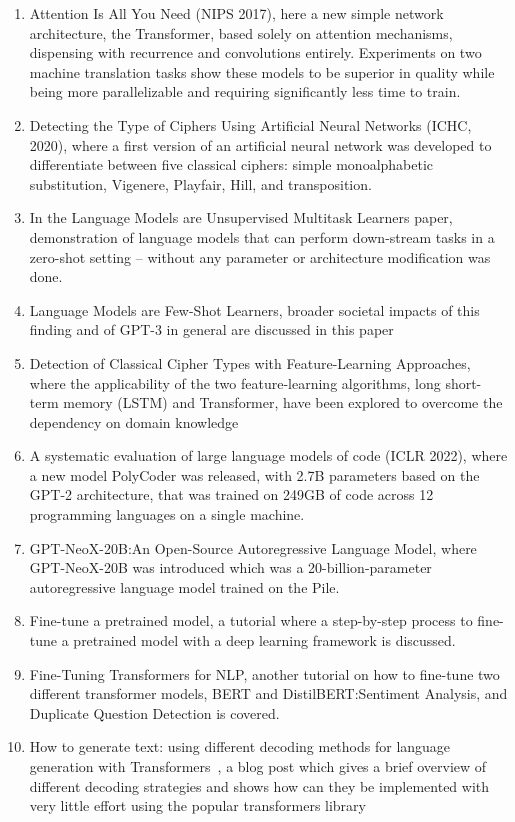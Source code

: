 \documentclass[a4paper]{article}
\begin{document}
\begin{enumerate}
    \item Attention Is All You Need\cite{https://doi.org/10.48550/arxiv.1706.03762} 
    (NIPS 2017), here a new simple network architecture, the 
    Transformer, based solely on attention mechanisms, dispensing 
    with recurrence and convolutions entirely. Experiments on 
    two machine translation tasks show these models to be superior 
    in quality while being more parallelizable and requiring 
    significantly less time to train.
    \item Detecting the Type of Ciphers Using Artificial Neural 
    Networks\cite{inproceedings} (ICHC, 2020), where a first 
    version of an artificial neural network was developed to 
    differentiate between five classical ciphers: simple 
    monoalphabetic substitution, Vigenere, Playfair, Hill, and
    transposition.
    \item In the Language Models are Unsupervised Multitask 
    Learners\cite{radford2019language} paper, demonstration 
    of language models that can perform down-stream tasks in 
    a zero-shot setting – without any parameter or architecture 
    modification was done.
    \item Language Models are Few-Shot Learners\cite{brown2020language}, 
    broader societal impacts of this finding and of GPT-3 in 
    general are discussed in this paper
    \item Detection of Classical Cipher Types with Feature-Learning 
    Approaches\cite{leierzopf2021detection}, where the applicability 
    of the two feature-learning algorithms, long short-term 
    memory (LSTM) and Transformer, have been explored to overcome 
    the dependency on domain knowledge
    \item A systematic evaluation of large language models of 
    code\cite{xu2022systematic} (ICLR 2022), where a new model 
    PolyCoder was released, with 2.7B parameters based on the GPT-2
    architecture, that was trained on 249GB of code across 12 
    programming languages on a single machine.
    \item GPT-NeoX-20B:\@ An Open-Source Autoregressive Language 
    Model\cite{black2022gpt}, where GPT-NeoX-20B was introduced 
    which was a 20-billion-parameter autoregressive language model 
    trained on the Pile.
    \item Fine-tune a pretrained model\cite{Finetune56:online}, 
    a tutorial where a step-by-step process to fine-tune a
    pretrained model with a deep learning framework is discussed.
    \item Fine-Tuning Transformers for NLP\cite{FineTuni38:online}, 
    another tutorial on how to fine-tune two different transformer 
    models, BERT and DistilBERT:\@ Sentiment Analysis, and Duplicate
    Question Detection is covered.
    \item How to generate text: using different decoding methods 
    for language generation with
    Transformers~\cite{Howtogen29:online}, a blog post which 
    gives a brief overview of different decoding
    strategies and shows how can they be implemented with very 
    little effort using the popular transformers library
\end{enumerate}
\end{document}
